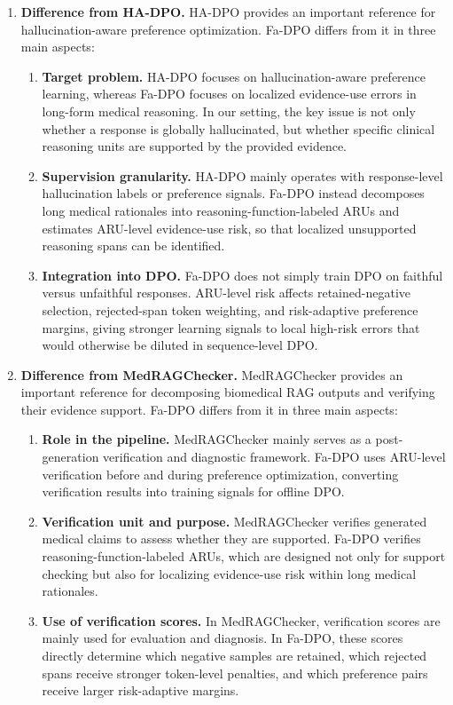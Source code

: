 \documentclass[12pt]{article}
\begin{document}
\begin{enumerate}
\item \textbf{Difference from HA-DPO.} HA-DPO provides an important reference for hallucination-aware preference optimization. Fa-DPO differs from it in three main aspects:
\begin{enumerate}
\item \textbf{Target problem.} HA-DPO focuses on hallucination-aware preference learning, whereas Fa-DPO focuses on localized evidence-use errors in long-form medical reasoning. In our setting, the key issue is not only whether a response is globally hallucinated, but whether specific clinical reasoning units are supported by the provided evidence.

    \item \textbf{Supervision granularity.} HA-DPO mainly operates with response-level hallucination labels or preference signals. Fa-DPO instead decomposes long medical rationales into reasoning-function-labeled ARUs and estimates ARU-level evidence-use risk, so that localized unsupported reasoning spans can be identified.

    \item \textbf{Integration into DPO.} Fa-DPO does not simply train DPO on faithful versus unfaithful responses. ARU-level risk affects retained-negative selection, rejected-span token weighting, and risk-adaptive preference margins, giving stronger learning signals to local high-risk errors that would otherwise be diluted in sequence-level DPO.
\end{enumerate}

\item \textbf{Difference from MedRAGChecker.} MedRAGChecker provides an important reference for decomposing biomedical RAG outputs and verifying their evidence support. Fa-DPO differs from it in three main aspects:
\begin{enumerate}
    \item \textbf{Role in the pipeline.} MedRAGChecker mainly serves as a post-generation verification and diagnostic framework. Fa-DPO uses ARU-level verification before and during preference optimization, converting verification results into training signals for offline DPO.

    \item \textbf{Verification unit and purpose.} MedRAGChecker verifies generated medical claims to assess whether they are supported. Fa-DPO verifies reasoning-function-labeled ARUs, which are designed not only for support checking but also for localizing evidence-use risk within long medical rationales.

    \item \textbf{Use of verification scores.} In MedRAGChecker, verification scores are mainly used for evaluation and diagnosis. In Fa-DPO, these scores directly determine which negative samples are retained, which rejected spans receive stronger token-level penalties, and which preference pairs receive larger risk-adaptive margins.
\end{enumerate}

\end{enumerate}
\end{document}
